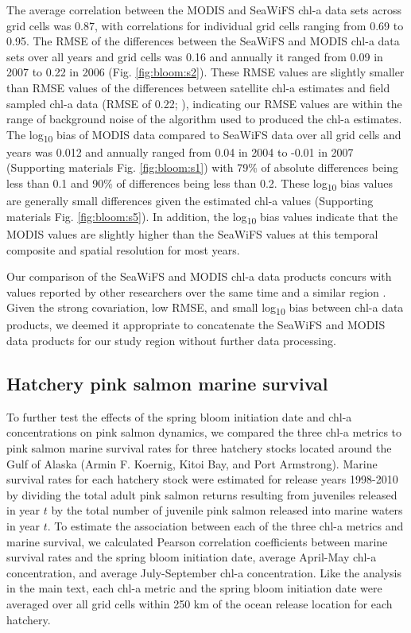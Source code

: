 The average correlation between the MODIS and SeaWiFS chl-a data sets
across grid cells was 0.87, with correlations for individual grid cells
ranging from 0.69 to 0.95. The RMSE of the differences between the
SeaWiFS and MODIS chl-a data sets over all years and grid cells was 0.16
and annually it ranged from 0.09 in 2007 to 0.22 in 2006 (Fig.
\ref{fig:bloom:s2}).
These RMSE values are slightly smaller than RMSE values of the
differences between satellite chl-a estimates and field sampled chl-a
data (RMSE of 0.22; \citep{OReilly2000a}), indicating our RMSE values
are within the range of background noise of the algorithm used to
produced the chl-a estimates. The log\textsubscript{10} bias of MODIS
data compared to SeaWiFS data over all grid cells and years was 0.012
and annually ranged from 0.04 in 2004 to -0.01 in 2007 (Supporting materials Fig. \ref{fig:bloom:s1}) with
79\% of absolute differences being less than 0.1 and 90\% of differences
being less than 0.2. These log\textsubscript{10} bias values are
generally small differences given the estimated chl-a values (Supporting
materials Fig.
\ref{fig:bloom:s5}).
In addition, the log\textsubscript{10} bias values indicate that the
MODIS values are slightly higher than the SeaWiFS values at this
temporal composite and spatial resolution for most years.

Our comparison of the SeaWiFS and MODIS chl-a data products concurs with
values reported by other researchers over the same time and a similar
region \citep{Waite2013}. Given the strong covariation, low RMSE,
and small log\textsubscript{10} bias between chl-a data products, we
deemed it appropriate to concatenate the SeaWiFS and MODIS data products
for our study region without further data processing.

\subsection{Hatchery pink salmon marine survival}
\label{supp:bloom:B}

To further test the effects of the spring bloom initiation date and
chl-a concentrations on pink salmon dynamics, we compared the three
chl-a metrics to pink salmon marine survival rates for three hatchery
stocks located around the Gulf of Alaska (Armin F. Koernig, Kitoi Bay,
and Port Armstrong). Marine survival rates for each hatchery stock were
estimated for release years 1998-2010 by dividing the total adult pink
salmon returns resulting from juveniles released in year \(t\) by the
total number of juvenile pink salmon released into marine waters in year
\(t\). To estimate the association between each of the three chl-a
metrics and marine survival, we calculated Pearson correlation
coefficients between marine survival rates and the spring bloom
initiation date, average April-May chl-a concentration, and average
July-September chl-a concentration. Like the analysis in the main text,
each chl-a metric and the spring bloom initiation date were averaged
over all grid cells within 250 km of the ocean release location for each
hatchery.

